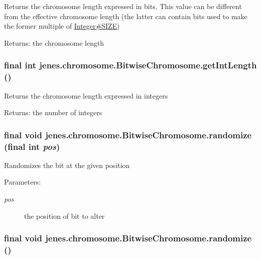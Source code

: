 Returns the chromosome length expressed in bits. This value can be different from the effective chromosome length (the latter can contain bits used to make the former multiple of \hyperlink{}{Integer\#SIZE})

\begin{Desc}
\item[Returns:]the chromosome length \end{Desc}
\hypertarget{classjenes_1_1chromosome_1_1_bitwise_chromosome_5878e8d0ace81cfb617f75109c02855d}{
\subsubsection[getIntLength]{\setlength{\rightskip}{0pt plus 5cm}final int jenes.chromosome.BitwiseChromosome.getIntLength ()}}
\label{classjenes_1_1chromosome_1_1_bitwise_chromosome_5878e8d0ace81cfb617f75109c02855d}


Returns the chromosome length expressed in integers

\begin{Desc}
\item[Returns:]the number of integers \end{Desc}
\hypertarget{classjenes_1_1chromosome_1_1_bitwise_chromosome_1a79d4c9c671d2f735d57d64c59dfdb8}{
\subsubsection[randomize]{\setlength{\rightskip}{0pt plus 5cm}final void jenes.chromosome.BitwiseChromosome.randomize (final int {\em pos})}}
\label{classjenes_1_1chromosome_1_1_bitwise_chromosome_1a79d4c9c671d2f735d57d64c59dfdb8}


Randomizes the bit at the given position

\begin{Desc}
\item[Parameters:]
\begin{description}
\item[{\em pos}]the position of bit to alter \end{description}
\end{Desc}
\hypertarget{classjenes_1_1chromosome_1_1_bitwise_chromosome_8028fde93528b7b51313f6c311b2b640}{
\subsubsection[randomize]{\setlength{\rightskip}{0pt plus 5cm}final void jenes.chromosome.BitwiseChromosome.randomize ()}}
\label{classjenes_1_1chromosome_1_1_bitwise_chromosome_8028fde93528b7b51313f6c311b2b640}


